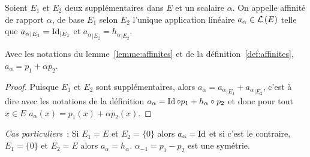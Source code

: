 %
\begin{defdef}\label{def:affinites}
  Soient \(E_1\) et \(E_2\) deux supplémentaires dans \(E\) et un scalaire 
  \(\alpha\). On appelle affinité de rapport \(\alpha\), de base \(E_1\) selon 
  \(E_2\) l'unique application linéaire \(a_\alpha \in \mathcal{L}\left(E\right)\) telle que 
  \({a_\alpha}_{|E_1} = \operatorname{Id}_{|E_1}\) et \({a_\alpha}_{|E_2} = 
  {h_\alpha}_{|E_2}\).
\end{defdef}
%
\begin{prop}
  Avec les notations du lemme~\ref{lemme:affinites} et de la définition~\ref{def:affinites}, \(a_{\alpha}=p_1+\alpha p_2\).
\end{prop}
\begin{proof}
  Puisque \(E_1\) et \(E_2\) sont supplémentaires, alors \(a_\alpha= 
  {a_\alpha}_{|E_1} + {a_\alpha}_{|E_2}\), c'est à dire avec les notations de la 
  définition \(a_\alpha= \operatorname{Id} \circ p_1 + h_\alpha \circ p_2\) et donc pour tout 
  \(x \in E\) \(a_\alpha(x)=p_1(x)+\alpha p_2(x)\).
\end{proof}

\emph{Cas particuliers}~: Si \(E_1=E\) et \(E_2=\{0\}\) alors \(a_\alpha=\operatorname{Id}\) 
et si c'est le contraire, \(E_1=\{0\}\) et \(E_2=E\) alors 
\(a_\alpha=h_\alpha\). \(\alpha_{-1}=p_1-p_2\) est une symétrie.

